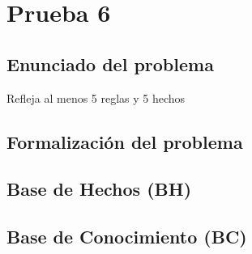 \section{Prueba 6}
\subsection{Enunciado del problema}
Refleja al menos 5 reglas y 5 hechos

\subsection{Formalización del problema}

\subsection{Base de Hechos (BH)}

\subsection{Base de Conocimiento (BC)}

